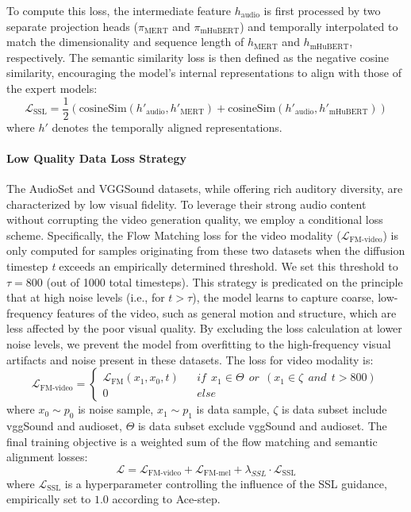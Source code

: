 To compute this loss, the intermediate feature $h_{\text{audio}}$ is first processed by two separate projection heads ($\pi_{\text{MERT}}$ and $\pi_{\text{mHuBERT}}$) and temporally interpolated to match the dimensionality and sequence length of $h_{\text{MERT}}$ and $h_{\text{mHuBERT}}$, respectively. The semantic similarity loss is then defined as the negative cosine similarity, encouraging the model's internal representations to align with those of the expert models:
$$
\mathcal{L}_{\text{SSL}} = \frac{1}{2} (\text{cosineSim}(h'_{\text{audio}}, h'_{\text{MERT}}) + \text{cosineSim}(h'_{\text{audio}}, h'_{\text{mHuBERT}}))
$$
where $h'$ denotes the temporally aligned representations.

\paragraph{Low Quality Data Loss Strategy} 

The AudioSet and VGGSound datasets, while offering rich auditory diversity, are characterized by low visual fidelity. To leverage their strong audio content without corrupting the video generation quality, we employ a conditional loss scheme.
Specifically, the Flow Matching loss for the video modality ($\mathcal{L}_{\text{FM-video}}$) is only computed for samples originating from these two datasets when the diffusion timestep \textit{t} exceeds an empirically determined threshold. We set this threshold to $\tau = 800$ (out of 1000 total timesteps). This strategy is predicated on the principle that at high noise levels (i.e., for $t > \tau$), the model learns to capture coarse, low-frequency features of the video, such as general motion and structure, which are less affected by the poor visual quality. By excluding the loss calculation at lower noise levels, we prevent the model from overfitting to the high-frequency visual artifacts and noise present in these datasets. The loss for video modality is:
$$
\mathcal{L}_{\text{FM-video}} = \left\{
\begin{array}{rcl}
\mathcal{L}_{\text{FM}}(x_1, x_0, t) & & if ~~ x_1 \in \Theta ~~ or ~~ (x_1 \in \zeta ~~ and ~~ t > 800)\\
0~~~~~~~~~ & & else
\end{array} \right.
$$
where $x_0 \sim p_0$ is noise sample, $x_1 \sim p_1$ is data sample, $\zeta$ is data subset include vggSound and audioset, $\Theta$ is data subset exclude vggSound and audioset. The final training objective is a weighted sum of the flow matching and semantic alignment losses:
$$
\mathcal{L} = \mathcal{L}_{\text{FM-video}} + \mathcal{L}_{\text{FM-mel}} + \lambda_{SSL}\cdot\mathcal{L}_{\text{SSL}}
$$
where $\mathcal{L}_{\text{SSL}}$ is a hyperparameter controlling the influence of the SSL guidance, empirically set to $1.0$ according to Ace-step.

